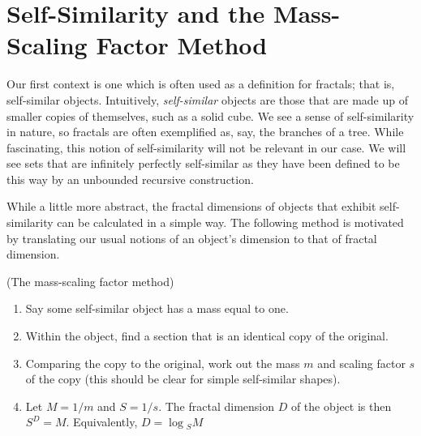 \section{Self-Similarity and the Mass-Scaling Factor Method}
Our first context is one which is often used as a definition for fractals; that is, self-similar objects. Intuitively, \emph{self-similar} objects are those that are made up of smaller copies of themselves, such as a solid cube. We see a sense of self-similarity in nature, so fractals are often exemplified as, say, the branches of a tree. While fascinating, this notion of self-similarity will not be relevant in our case. We will see sets that are infinitely perfectly self-similar as they have been defined to be this way by an unbounded recursive construction.

While a little more abstract, the fractal dimensions of objects that exhibit self-similarity can be calculated in a simple way. The following method is motivated by translating our usual notions of an object's dimension to that of fractal dimension. 

\begin{prop} \label{MSF}
    (The mass-scaling factor method)
    \begin{enumerate}
        \item Say some self-similar object has a mass equal to one.
        \item Within the object, find a section that is an identical copy of the original.
        \item Comparing the copy to the original, work out the mass $m$ and scaling factor $s$ of the copy (this should be clear for simple self-similar shapes).
        \item Let $M=1/m$ and $S=1/s$. The fractal dimension $D$ of the object is then $S^D=M.$ Equivalently, $D=\log{_SM}$
    \end{enumerate}
\end{prop}

